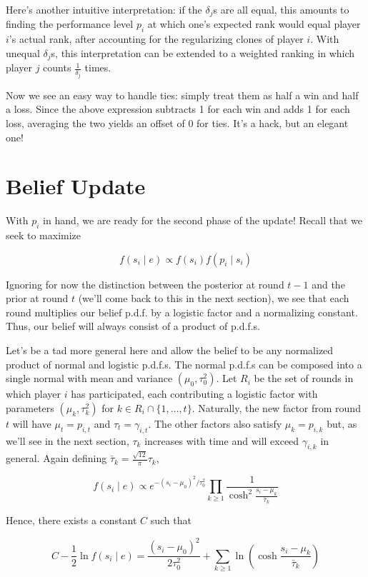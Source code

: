 \documentclass{article}
\begin{document}
Here's another intuitive interpretation: if the $\delta_j$s are all equal, this amounts to finding the performance level $p_i$ at which one's expected rank would equal player $i$'s actual rank, after accounting for the regularizing clones of player $i$. With unequal $\delta_j$s, this interpretation can be extended to a weighted ranking in which player $j$ counts $\frac{1}{\delta_j}$ times.

Now we see an easy way to handle ties: simply treat them as half a win and half a loss. Since the above expression subtracts 1 for each win and adds 1 for each loss, averaging the two yields an offset of 0 for ties. It's a hack, but an elegant one!

\section{Belief Update}

With $p_i$ in hand, we are ready for the second phase of the update! Recall that we seek to maximize

\[f(s_i\mid e) \propto f(s_i)f(p_i\mid s_i)\]

Ignoring for now the distinction between the posterior at round $t-1$ and the prior at round $t$ (we'll come back to this in the next section), we see that each round multiplies our belief p.d.f. by a logistic factor and a normalizing constant. Thus, our belief will always consist of a product of p.d.f.s.

Let's be a tad more general here and allow the belief to be any normalized product of normal and logistic p.d.f.s. The normal p.d.f.s can be composed into a single normal with mean and variance $(\mu_0, \tau_0^2)$. Let $R_i$ be the set of rounds in which player $i$ has participated, each contributing a logistic factor with parameters $(\mu_k, \tau_k^2)$ for $k\in R_i\cap \{1,\ldots,t\}$. Naturally, the new factor from round $t$ will have $\mu_t = p_{i,t}$ and $\tau_t = \gamma_{i,t}$. The other factors also satisfy $\mu_k = p_{i,k}$ but, as we'll see in the next section, $\tau_k$ increases with time and will exceed $\gamma_{i,k}$ in general. Again defining $\bar\tau_k = \frac{\sqrt{12}}{\pi} \tau_k$,

\[
f(s_i\mid e)
\propto e^{-(s_i-\mu_0)^2/\tau_0^2} \prod_{k\ge 1} \frac { 1 } { \cosh^2\frac{s_i-\mu_k} {\bar\tau_k} }
\]

Hence, there exists a constant $C$ such that

\[C - \frac 1 2 \ln f(s_i \mid e) = \frac{(s_i-\mu_0)^2}{2\tau_0^2} + \sum_{k\ge 1} \ln\left( \cosh\frac{s_i-\mu_k}{\bar\tau_k} \right)\]
\end{document}
